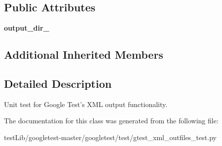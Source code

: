 \subsection*{Public Attributes}
\begin{DoxyCompactItemize}
\item 
\mbox{\label{classgtest__xml__outfiles__test_1_1GTestXMLOutFilesTest_aa5c31cd97047bc1d3060f4d27bc956a4}} 
{\bfseries output\+\_\+dir\+\_\+}
\end{DoxyCompactItemize}
\subsection*{Additional Inherited Members}


\subsection{Detailed Description}
\begin{DoxyVerb}Unit test for Google Test's XML output functionality.\end{DoxyVerb}
 

The documentation for this class was generated from the following file\+:\begin{DoxyCompactItemize}
\item 
test\+Lib/googletest-\/master/googletest/test/gtest\+\_\+xml\+\_\+outfiles\+\_\+test.\+py\end{DoxyCompactItemize}
